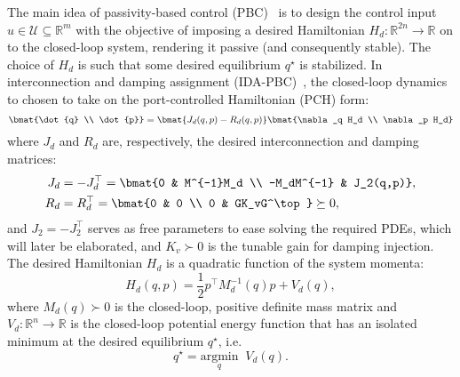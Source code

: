 The main idea of passivity-based control (PBC)~\citep{van2000l2} is to design
the control input $u \in \mathscr{U} \subseteq \mathbb{R}^m$ with the objective
of imposing a desired Hamiltonian $H_d: \mathbb{R}^{2n} \rightarrow \mathbb{R}$
on to the closed-loop system, rendering it passive (and consequently stable).
%
The choice of $H_d$ is such that some desired equilibrium $q^\star$ is stabilized.
%
In interconnection and damping assignment
(IDA-PBC)~\citep{ortega2002stabilization}, the closed-loop dynamics to chosen to
take on the port-controlled Hamiltonian (PCH) form:
%
\begin{equation}
  \bmat{\dot{q} \\ \dot{p}}
  =
  \bmat{J_d(q,p) - R_d(q,p)}
  \bmat{\nabla_q H_d \\ \nabla_p H_d}
  \label{eq:pch}
\end{equation}
%
where $J_d$ and $R_d$ are, respectively, the desired interconnection and damping
matrices:
%
\begin{align*}
    J_d &= -J_d^\top = \bmat{0 & M^{-1}M_d \\ -M_dM^{-1} & J_2(q,p)}, \\
    R_d &= R_d^\top = \bmat{0 & 0 \\ 0 & GK_vG^\top} \succeq 0, 
\end{align*}
%
and $J_2 = -J_2^\top$ serves as free parameters to ease solving the required
PDEs, which will later be elaborated, and $K_v \succ 0$ is the tunable gain for
damping injection.
%
The desired Hamiltonian $H_d$ is a quadratic function of the system momenta:
%
%
\begin{equation}
    H_d(q, p) = \frac{1}{2} p^\top M_d^{-1}(q) p + V_d(q),
    \label{eq:desired_hamiltonian}
\end{equation}
%
where $M_d(q) \succ 0$ is the closed-loop, positive definite mass matrix and
$V_d: \mathbb{R}^n \to \mathbb{R} $ is the closed-loop potential energy function that has an isolated
minimum at the desired equilibrium $q^\star$, i.e.
%
\begin{equation}
  q^\star = \underset{q}{\textrm{argmin}} \; \; V_d(q).
  \label{eq:argmin_Vd}
\end{equation}



